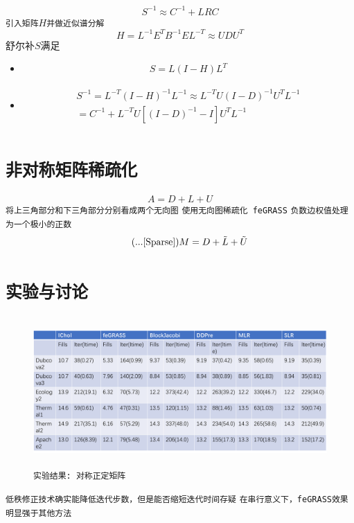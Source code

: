 \documentclass[11pt, a4paper]{article}
\theoremstyle{plain}
\theoremstyle{plain}
\theoremstyle{plain}
\theoremstyle{definition}
\theoremstyle{remark}
\theoremstyle{definition}
\newcommand{\T}[1]{\texttt{#1}}
\begin{document}
\begin{equation}
	S^{-1} \approx C^{-1} + LRC
\end{equation}
\T{引入矩阵$H$并做近似谱分解}
\[
	H = L^{-1}E^TB^{-1}EL^{-T} \approx UDU^T
\]
舒尔补$S$满足
\begin{itemize}
	\item 
	\begin{equation}
		S = L(I - H)L^T
	\end{equation}
		

	\item 
	\begin{gather}
		\begin{split}
			S^{-1} = L^{-T} (I - H)^{-1}L^{-1} \approx L^{-T} U (I - D)^{-1} U^T L^{-1} \\
			= C^{-1} + L^{-T} U[(I - D)^{-1} - I]U^TL^{-1}
		\end{split}
	\end{gather}
		
\end{itemize}

\section{\T{非对称矩阵稀疏化}}
\begin{equation}
	A = D + L + U
\end{equation}
\T{将上三角部分和下三角部分分别看成两个无向图}
\T{使用无向图稀疏化 feGRASS}
\T{负数边权值处理为一个极小的正数}
\begin{equation}
	\tag{...\cite{Sparse}}
	M = D + \tilde{L} + \tilde{U}
\end{equation}




\section*{\T{实验与讨论}}
\begin{figure}[H]
	\caption{\T{实验结果: 对称正定矩阵}}
	\centering
	\includegraphics[width=350pt,height=160pt]{SPD_res.png}
\end{figure}
\T{低秩修正技术确实能降低迭代步数，但是能否缩短迭代时间存疑}
\T{在串行意义下，feGRASS效果明显强于其他方法
}
\end{document}
